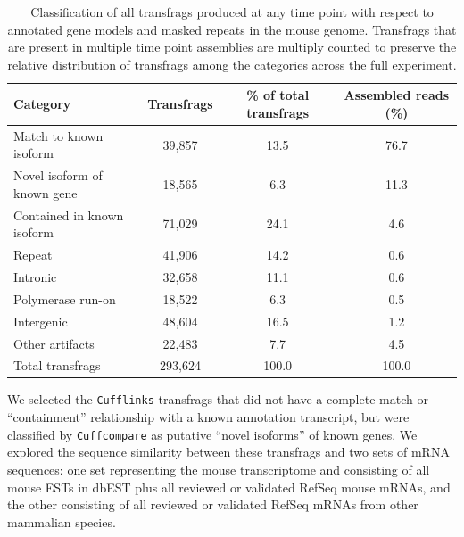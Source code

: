 \documentclass[12pt]{amsart}
\theoremstyle{definition}
\begin{document}
\begin{table}[h]{
    \Small
    \begin{tabular}{l|c|c|c} 
        \hline
        \textbf{Category} & \textbf{Transfrags} & \textbf{\% of total transfrags} & \textbf{Assembled reads} (\%) \\
        \hline
        Match to known isoform & 39,857 & 13.5 &	76.7 \\
        Novel isoform of known gene & 18,565 & 6.3 & 11.3 \\
        Contained in known isoform & 71,029 & 24.1 & 4.6 \\
        Repeat & 41,906 & 14.2 & 0.6 \\
        Intronic & 32,658 & 11.1 & 0.6 \\
        Polymerase run-on & 18,522 & 6.3 & 0.5 \\
        Intergenic & 48,604 & 16.5 & 1.2 \\
        Other artifacts & 22,483 & 7.7 & 4.5 \\
        \hline
        Total transfrags & 293,624 & 100.0 & 100.0 \\
        \hline
        
    \end{tabular}
    }
\caption[Types of assembled transfrags]{Classification of all transfrags produced at any time point with respect to annotated gene models and masked repeats in the mouse genome.  Transfrags that are present in multiple time point assemblies are multiply counted to preserve the relative distribution of transfrags among the categories across the full experiment. \label{category_table}}
\end{table}

We selected the {\tt Cufflinks} transfrags that did not have a complete match
or ``containment'' relationship with a known annotation transcript, but were
classified by {\tt Cuffcompare} as putative ``novel isoforms'' of known genes. We
explored the sequence similarity between these transfrags and two sets of mRNA
sequences: one set representing the mouse transcriptome and consisting of all
mouse ESTs in dbEST plus all reviewed or validated RefSeq mouse mRNAs, and the
other consisting of all reviewed or validated RefSeq mRNAs from other
mammalian species.
\end{document}
